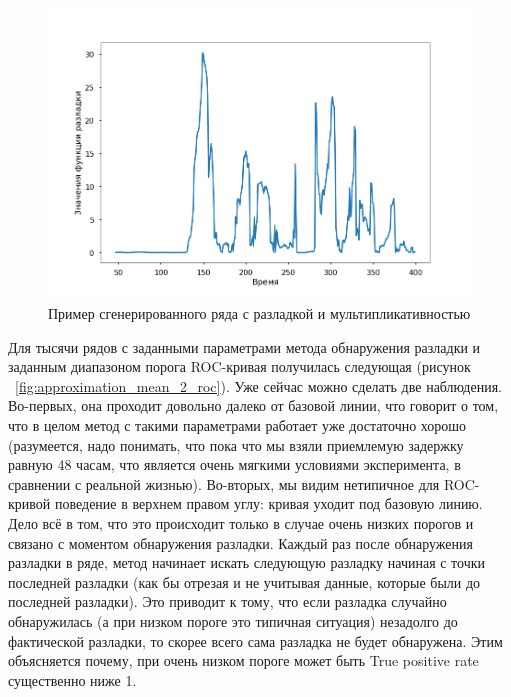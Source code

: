 \documentclass[%
12pt,
master,  %
natbib,      %
subf,        %
substylefile = spbu.rtx,
href,        %
colorlinks,  %
]{disser}
\begin{document}
\begin{figure}[!hhh]
	\begin{center}
		\includegraphics[width=12cm]{approximation_mean_1}
	\end{center}
	\vspace{-5mm}\caption{Пример сгенерированного ряда с разладкой и мультипликативностью}
	\label{fig:approximation_mean_1}
\end{figure}

Для тысячи рядов с заданными параметрами метода обнаружения разладки и заданным диапазоном порога ROC-кривая получилась следующая (рисунок ~\ref{fig:approximation_mean_2_roc}). Уже сейчас можно сделать две наблюдения. Во-первых, она проходит довольно далеко от базовой линии, что говорит о том, что в целом метод с такими параметрами работает уже достаточно хорошо (разумеется, надо понимать, что пока что мы взяли приемлемую задержку равную 48 часам, что является очень мягкими условиями эксперимента, в сравнении с реальной жизнью). Во-вторых, мы видим нетипичное для ROC-кривой поведение в верхнем правом углу: кривая уходит под базовую линию. Дело всё в том, что это происходит только в случае очень низких порогов и связано с моментом обнаружения разладки. Каждый раз после обнаружения разладки в ряде, метод начинает искать следующую разладку начиная с точки последней разладки (как бы отрезая и не учитывая данные, которые были до последней разладки). Это приводит к тому, что если разладка случайно обнаружилась (а при низком пороге это типичная ситуация) незадолго до фактической разладки, то скорее всего сама разладка не будет обнаружена. Этим объясняется почему, при очень низком пороге может быть True positive rate существенно ниже 1.
\end{document}
